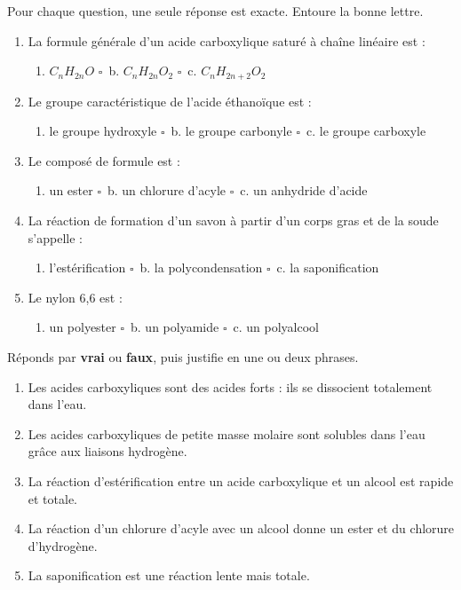 \documentclass[11pt]{article}
\begin{document}
\begin{exercice}
Pour chaque question, une seule réponse est exacte. Entoure la bonne lettre.
\begin{enumerate}
\item La formule générale d'un acide carboxylique saturé à chaîne linéaire est :
\begin{enumerate}
\item[$\square$~a.] $C_nH_{2n}O$ \hfill $\square$~b. $C_nH_{2n}O_2$ \hfill $\square$~c. $C_nH_{2n+2}O_2$
\end{enumerate}
\item Le groupe caractéristique de l'acide éthanoïque est :
\begin{enumerate}
\item[$\square$~a.] le groupe hydroxyle \hfill $\square$~b. le groupe carbonyle \hfill $\square$~c. le groupe carboxyle
\end{enumerate}
\item Le composé de formule  est :
\begin{enumerate}
\item[$\square$~a.] un ester \hfill $\square$~b. un chlorure d'acyle \hfill $\square$~c. un anhydride d'acide
\end{enumerate}
\item La réaction de formation d'un savon à partir d'un corps gras et de la soude s'appelle :
\begin{enumerate}
\item[$\square$~a.] l'estérification \hfill $\square$~b. la polycondensation \hfill $\square$~c. la saponification
\end{enumerate}
\item Le nylon 6,6 est :
\begin{enumerate}
\item[$\square$~a.] un polyester \hfill $\square$~b. un polyamide \hfill $\square$~c. un polyalcool
\end{enumerate}
\end{enumerate}
\end{exercice}

\begin{exercice}
Réponds par \textbf{vrai} ou \textbf{faux}, puis justifie en une ou deux phrases.
\begin{enumerate}
\item Les acides carboxyliques sont des acides forts : ils se dissocient totalement dans l'eau.
\item Les acides carboxyliques de petite masse molaire sont solubles dans l'eau grâce aux liaisons hydrogène.
\item La réaction d'estérification entre un acide carboxylique et un alcool est rapide et totale.
\item La réaction d'un chlorure d'acyle avec un alcool donne un ester et du chlorure d'hydrogène.
\item La saponification est une réaction lente mais totale.
\end{enumerate}
\end{exercice}
\end{document}
